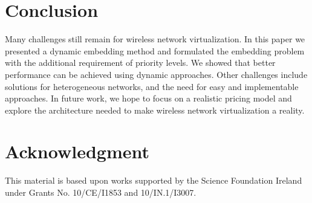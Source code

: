 \documentclass[conference]{IEEEtran}
\begin{document}
\section{Conclusion}
\label{sect:conclusion}
Many challenges still remain for wireless network virtualization. In this paper we presented a dynamic embedding method and formulated the embedding problem with the additional requirement of priority levels. We showed that better performance can be achieved using dynamic approaches.
Other challenges include solutions for heterogeneous networks, and the need for easy and implementable approaches. In future work, we hope to focus on a realistic pricing model and explore the architecture needed to make wireless network virtualization a reality.


\section*{Acknowledgment}

This material is based upon works supported by the Science Foundation
Ireland under Grants No. 10/CE/I1853 and 10/IN.1/I3007.


































\end{document}
